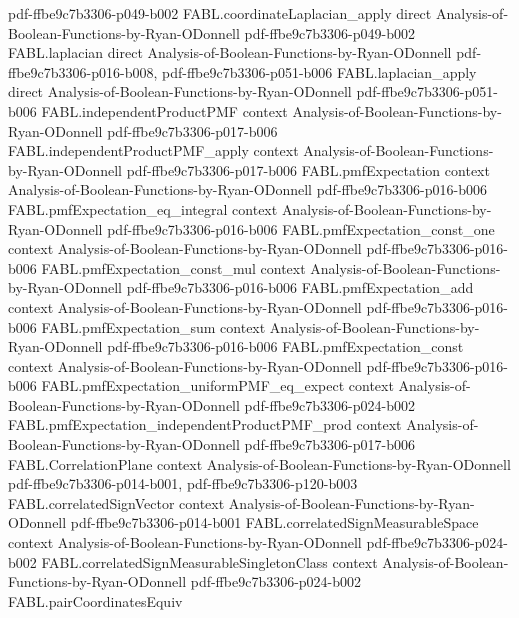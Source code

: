 \begin{theorem}
  {pdf-ffbe9c7b3306-p049-b002}
\proofstep
  {FABL.coordinateLaplacian_apply}
  {direct}
  {Analysis-of-Boolean-Functions-by-Ryan-ODonnell}
  {pdf-ffbe9c7b3306-p049-b002}
\proofstep
  {FABL.laplacian}
  {direct}
  {Analysis-of-Boolean-Functions-by-Ryan-ODonnell}
  {pdf-ffbe9c7b3306-p016-b008,
    pdf-ffbe9c7b3306-p051-b006}
\proofstep
  {FABL.laplacian_apply}
  {direct}
  {Analysis-of-Boolean-Functions-by-Ryan-ODonnell}
  {pdf-ffbe9c7b3306-p051-b006}
\proofstep
  {FABL.independentProductPMF}
  {context}
  {Analysis-of-Boolean-Functions-by-Ryan-ODonnell}
  {pdf-ffbe9c7b3306-p017-b006}
\proofstep
  {FABL.independentProductPMF_apply}
  {context}
  {Analysis-of-Boolean-Functions-by-Ryan-ODonnell}
  {pdf-ffbe9c7b3306-p017-b006}
\proofstep
  {FABL.pmfExpectation}
  {context}
  {Analysis-of-Boolean-Functions-by-Ryan-ODonnell}
  {pdf-ffbe9c7b3306-p016-b006}
\proofstep
  {FABL.pmfExpectation_eq_integral}
  {context}
  {Analysis-of-Boolean-Functions-by-Ryan-ODonnell}
  {pdf-ffbe9c7b3306-p016-b006}
\proofstep
  {FABL.pmfExpectation_const_one}
  {context}
  {Analysis-of-Boolean-Functions-by-Ryan-ODonnell}
  {pdf-ffbe9c7b3306-p016-b006}
\proofstep
  {FABL.pmfExpectation_const_mul}
  {context}
  {Analysis-of-Boolean-Functions-by-Ryan-ODonnell}
  {pdf-ffbe9c7b3306-p016-b006}
\proofstep
  {FABL.pmfExpectation_add}
  {context}
  {Analysis-of-Boolean-Functions-by-Ryan-ODonnell}
  {pdf-ffbe9c7b3306-p016-b006}
\proofstep
  {FABL.pmfExpectation_sum}
  {context}
  {Analysis-of-Boolean-Functions-by-Ryan-ODonnell}
  {pdf-ffbe9c7b3306-p016-b006}
\proofstep
  {FABL.pmfExpectation_const}
  {context}
  {Analysis-of-Boolean-Functions-by-Ryan-ODonnell}
  {pdf-ffbe9c7b3306-p016-b006}
\proofstep
  {FABL.pmfExpectation_uniformPMF_eq_expect}
  {context}
  {Analysis-of-Boolean-Functions-by-Ryan-ODonnell}
  {pdf-ffbe9c7b3306-p024-b002}
\proofstep
  {FABL.pmfExpectation_independentProductPMF_prod}
  {context}
  {Analysis-of-Boolean-Functions-by-Ryan-ODonnell}
  {pdf-ffbe9c7b3306-p017-b006}
\proofstep
  {FABL.CorrelationPlane}
  {context}
  {Analysis-of-Boolean-Functions-by-Ryan-ODonnell}
  {pdf-ffbe9c7b3306-p014-b001,
    pdf-ffbe9c7b3306-p120-b003}
\proofstep
  {FABL.correlatedSignVector}
  {context}
  {Analysis-of-Boolean-Functions-by-Ryan-ODonnell}
  {pdf-ffbe9c7b3306-p014-b001}
\proofstep
  {FABL.correlatedSignMeasurableSpace}
  {context}
  {Analysis-of-Boolean-Functions-by-Ryan-ODonnell}
  {pdf-ffbe9c7b3306-p024-b002}
\proofstep
  {FABL.correlatedSignMeasurableSingletonClass}
  {context}
  {Analysis-of-Boolean-Functions-by-Ryan-ODonnell}
  {pdf-ffbe9c7b3306-p024-b002}
\proofstep
  {FABL.pairCoordinatesEquiv}

\end{theorem}
